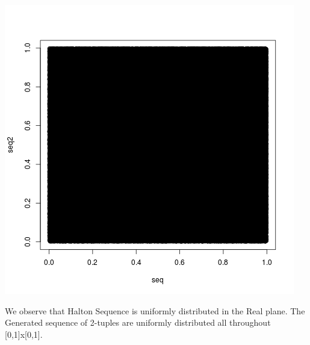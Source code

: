 \documentclass{article}
\begin{document}
\begin{center}
	\includegraphics{Question2_2.png}
\end{center}

We observe that Halton Sequence is uniformly distributed in the Real plane. The Generated sequence of 2-tuples are uniformly distributed all throughout [0,1]x[0,1].
\end{document}

